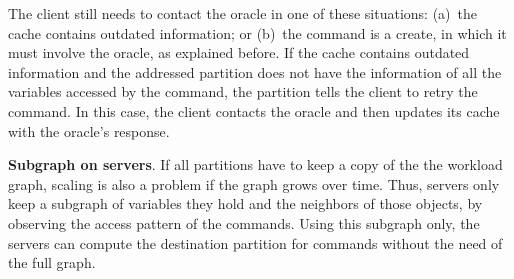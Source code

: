 The client still needs to contact the oracle in one of these situations:
(a)~the cache contains outdated information; or
(b)~the command is a create, in which it must involve the oracle, as explained before.
If the cache contains outdated information and the addressed partition does not have the information of all the variables accessed by the command, the partition tells the client to retry the command.
In this case, the client contacts the oracle and then updates its cache with the oracle's response.

\textbf{Subgraph on servers}. If all partitions have to keep a copy of the the workload graph, scaling is also a problem if the graph grows over time. Thus, servers only keep a subgraph of variables they hold and the neighbors of those objects, by observing the access pattern of the commands. Using this subgraph only, the servers can compute the destination partition for commands without the need of the full graph.






